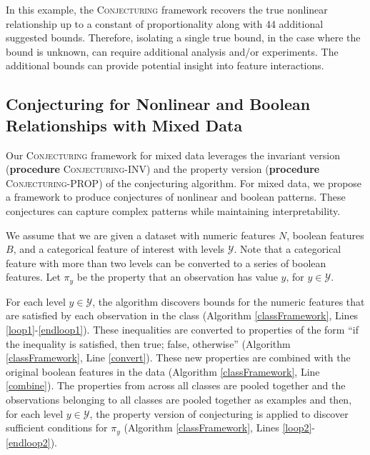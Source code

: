 \documentclass[ijds,nonblindrev]{informs-ijds}
\begin{document}
In this example, the \textsc{Conjecturing} framework recovers the true nonlinear relationship up to a constant of proportionality along with 44 additional suggested bounds.  Therefore, isolating a single true bound, in the case where the bound is unknown, can require additional analysis and/or experiments.  The additional bounds can provide potential insight into feature interactions.    

\subsection{Conjecturing for Nonlinear and Boolean Relationships with Mixed Data}
\label{realestate_exp1}
Our \textsc{Conjecturing} framework for mixed data leverages the invariant version ({\bf procedure} \textsc{Conjecturing-INV}) and the property version ({\bf procedure} \textsc{Conjecturing-PROP}) of the conjecturing algorithm.  For mixed data, we propose a framework to produce conjectures of nonlinear and boolean patterns.  These conjectures can capture complex patterns while maintaining interpretability.  

We assume that we are given a dataset with numeric features $N$, boolean features $B$, and a categorical feature of interest with levels $\mathcal{Y}$.  Note that a categorical feature with more than two levels can be converted to a series of boolean features.  Let $\pi_y$ be the property that an observation has value $y$, for $y \in \mathcal{Y}$.

For each level $y\in \mathcal{Y}$, the algorithm discovers bounds for the numeric features that are satisfied by each observation in the class (Algorithm \ref{classFramework}, Lines \ref{loop1}-\ref{endloop1}).  These inequalities are converted to properties of the form ``if the inequality is satisfied, then true; false, otherwise'' (Algorithm \ref{classFramework}, Line \ref{convert}).  These new properties are combined with the original boolean features in the data (Algorithm \ref{classFramework}, Line \ref{combine}).  The properties from across all classes are pooled together and the observations belonging to all classes are pooled together as examples and then, for each level $y\in \mathcal{Y}$, the property version of conjecturing is applied to discover sufficient conditions for $\pi_y$ (Algorithm \ref{classFramework}, Lines \ref{loop2}-\ref{endloop2}).  
\end{document}
